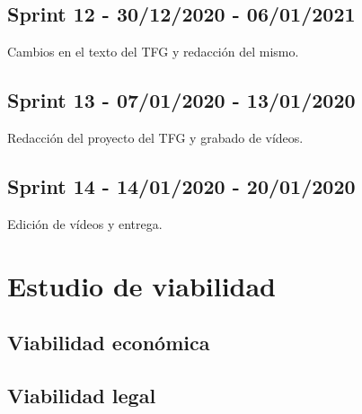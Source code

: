 \subsection{Sprint 12 - 30/12/2020 - 06/01/2021}
Cambios en el texto del TFG y redacción del mismo.

\subsection{Sprint 13 - 07/01/2020 - 13/01/2020}
Redacción del proyecto del TFG y grabado de vídeos.

\subsection{Sprint 14 - 14/01/2020 - 20/01/2020}
Edición de vídeos y entrega.



\section{Estudio de viabilidad}

\subsection{Viabilidad económica}

\subsection{Viabilidad legal}


